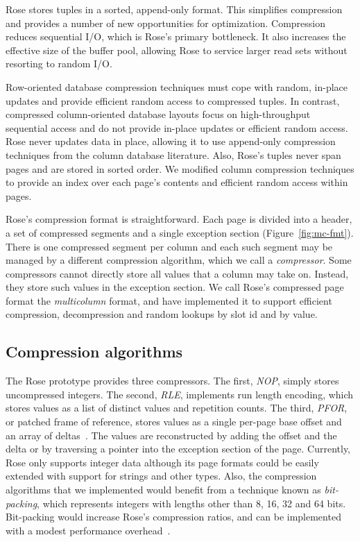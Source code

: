 \documentclass{vldb}
\newcommand{\rows}{Rose\xspace}
\newcommand{\rowss}{Rose's\xspace}
\begin{document}
\rows stores tuples in a sorted, append-only format.  This 
simplifies compression and provides a number of new opportunities for
optimization.  Compression reduces sequential I/O, which is \rowss primary bottleneck.
It also
increases the effective size of the buffer pool, allowing \rows to
service larger read sets without resorting to random I/O.

Row-oriented database compression techniques must cope with random,
in-place updates and provide efficient random access to compressed
tuples.  In contrast, compressed column-oriented database layouts
focus on high-throughput sequential access and do not provide in-place
updates or efficient random access.  \rows never updates data in
place, allowing it to use append-only compression techniques
from the column database literature.  Also, \rowss tuples never span pages and
are stored in sorted order.  We modified column compression techniques to provide an
index over each page's contents and efficient random access within
pages.

\rowss compression format is straightforward.  Each page is divided into
a header, a set of compressed segments and a single exception section
(Figure~\ref{fig:mc-fmt}).  There is one compressed segment per column
and each such segment may be managed by a different compression
algorithm, which we call a {\em compressor}.  Some compressors cannot
directly store all values that a column may take on.  Instead, they
store such values in the exception section.  We call
\rowss compressed page format the {\em multicolumn} format, and have
implemented it to support efficient compression,
decompression and random lookups by slot id and by value.

\subsection{Compression algorithms}
The \rows prototype provides three compressors.  The first, {\em NOP},
simply stores uncompressed integers.  The second, {\em RLE},
implements run length encoding, which stores values as a list of
distinct values and repetition counts.  The third, {\em PFOR}, or
patched frame of reference, stores values as a single per-page
base offset and an array of deltas~\cite{pfor}.  The values are reconstructed by
adding the offset and the delta or by traversing a pointer into the
exception section of the page.  Currently, \rows only supports integer
data although its page formats could be easily extended with support for strings and
other types.  Also, the compression algorithms that we
implemented would benefit from a technique known as {\em bit-packing},
which represents integers with lengths other than 8, 16, 32 and 64
bits.  Bit-packing would increase \rowss compression ratios,
and can be implemented with a modest performance overhead~\cite{pfor}.
\end{document}
